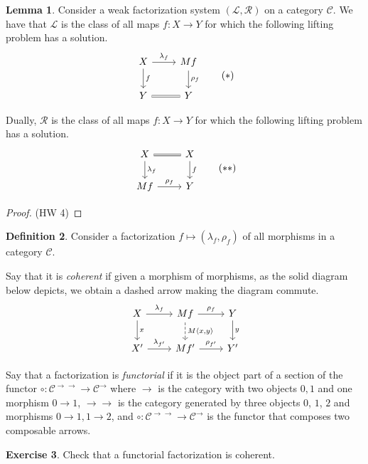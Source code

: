 \documentclass{article}
\theoremstyle{definition}
\newtheorem{definition}{Definition}[section]
\newtheorem{lemma}[definition]{Lemma}
\newtheorem{exercise}[definition]{Exercise}
\newcommand{\C}{\mathcal C}
\begin{document}
\begin{lemma}
    \label{lem:factorization}
    Consider a weak factorization system $(\mathcal L, \mathcal R)$ on a category $\C$. We have that $\mathcal L$ is the class of all maps $f: X \to Y$ for which the following lifting problem has a solution.
    \[
         \begin{tikzcd}
             X \ar[r,"\lambda_f"] \ar[d,"f"] & Mf \ar[d,"\rho_f"]
             \\ 
             Y \ar[r,equal] & Y
         \end{tikzcd}
         \tag{$*$}
    \]

    Dually, $\mathcal R$ is the class of all maps $f: X \to Y$ for which the following lifting problem has a solution.
    \[
         \begin{tikzcd}
             X \ar[r,equal] \ar[d,"\lambda_f"] & X \ar[d,"f"]
             \\ 
             Mf \ar[r,"\rho_f"] & Y
         \end{tikzcd}
         \tag{$**$}
    \]
\end{lemma}
\begin{proof}
    (HW 4)
\end{proof}

\begin{definition}
    Consider a factorization $f \mapsto (\lambda_f, \rho_f)$ of all morphisms in a category $\C$.
    
    Say that it is \emph{coherent} if given a morphism of morphisms, as the solid diagram below depicts, we obtain a dashed arrow making the diagram commute.
    \[
         \begin{tikzcd}
             X \ar[r,"\lambda_f"] \ar[d,"x"] & Mf \ar[d,"{M\langle x , y \rangle}", dashed] \ar[r,"\rho_f"] & Y \ar[d,"y"]
             \\ 
             X' \ar[r,"\lambda_{f'}"] & Mf' \ar[r,"\rho_{f'}"] & Y'
         \end{tikzcd}
    \]

    Say that a factorization is \emph{functorial} if it is the object part of a section of the functor $\circ : \C^{\to \to} \to \C^\to$ where $\to$ is the category with two objects $0,1$ and one morphism $0 \to 1$, $\to \to$ is the category generated by three objects $0$, $1$, $2$ and morphisms $0 \to 1, 1 \to 2$, and $\circ : \C^{\to \to} \to \C^\to$ is the functor that composes two composable arrows.
\end{definition}

\begin{exercise}
    Check that a functorial factorization is coherent.
\end{exercise}
\end{document}
